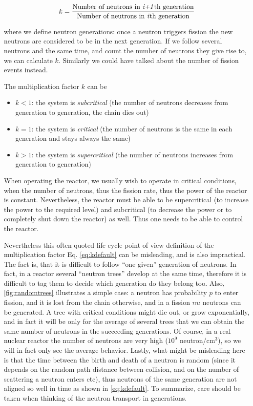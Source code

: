 \begin{equation}\label{eq:kdefault}
k=\frac{\text{Number of neutrons in \textit{i+1}th generation}}{\text{Number of neutrons in \textit{i}th generation}}
\end{equation}

where we define neutron generations: once a neutron triggers fission the new neutrons are considered to be in the next generation. If we follow several neutrons and the same time, and count the number of neutrons they give rise to, we can calculate $k$. Similarly we could have talked about the number of fission events instead. 

The multiplication factor $k$ can be

\begin{itemize}
\item $k<1$: the system is \textit{subcritical} (the number of neutrons decreases from generation to generation, the chain dies out)
\item $k=1$: the system is \textit{critical} (the number of neutrons is the same in each generation and stays always the same)
\item $k>1$: the system is \textit{supercritical} (the number of neutrons increases from generation to generation)
\end{itemize}

When operating the reactor, we usually wish to operate in critical conditions, when the number of neutrons, thus the fission rate, thus the power of the reactor is constant. Nevertheless, the reactor must be able to be supercritical (to increase the power to the required level) and subcritical (to decrease the power or to completely shut down the reactor) as well. Thus one needs to be able to control the reactor.

Nevertheless this often quoted life-cycle point of view definition of the multiplication factor Eq. \ref{eq:kdefault} can be misleading, and is also impractical. The fact is, that it is difficult to follow ``one given'' generation of neutrons. In fact, in a reactor several ``neutron trees'' develop at the same time, therefore it is difficult to tag them to decide which generation do they belong too. Also, \autoref{fig:randomtrees} illustrates a simple case: a neutron has probability $p$ to enter fission, and it is lost from the chain otherwise, and in a fission $nu$ neutrons can be generated. A tree with critical conditions might die out, or grow exponentially, and in fact it will be only for the average of several trees that we can obtain the same number of neutrons in the succeeding generations. Of course, in a real nuclear reactor the number of neutrons are very high ($10^9$ neutron/cm$^3$), so we will in fact only see the average behavior. Lastly, what might be misleading here is that the time between the birth and death of a neutron is random (since it depends on the random path distance between collision, and on the number of scattering a neutron enters etc), thus neutrons of the same generation are not aligned so well in time as shown in \autoref{eq:kdefault}. To summarize, care should be taken when thinking of the neutron transport in generations. 


